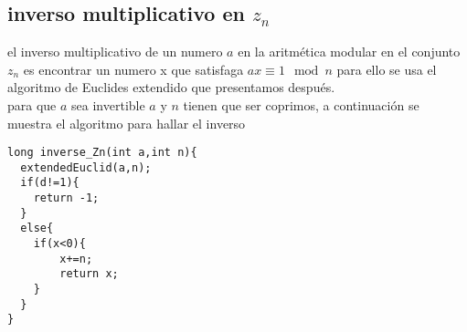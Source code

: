 \subsection{inverso multiplicativo en $z_{n}$}
el inverso multiplicativo de un numero $a$ en la aritmética modular en el conjunto $z_{n}$ es encontrar un numero
x que satisfaga $ax \equiv 1 \mod{n}$ para ello se usa el algoritmo de Euclides extendido que presentamos después.\\
para que $a$ sea invertible $a$ y $n$ tienen que ser coprimos, a continuación se muestra el algoritmo para hallar el inverso
\begin{lstlisting}[style=C]
long inverse_Zn(int a,int n){
  extendedEuclid(a,n);
  if(d!=1){
  	return -1;
  }
  else{
  	if(x<0){
  		x+=n;
   		return x;
  	}
  }
}
\end{lstlisting}
